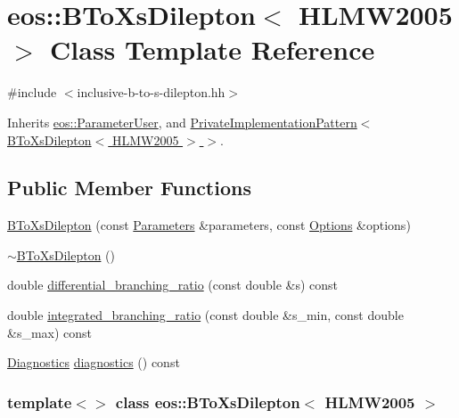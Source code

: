 \hypertarget{classeos_1_1BToXsDilepton_3_01HLMW2005_01_4}{
\section{eos::BToXsDilepton$<$ HLMW2005 $>$ Class Template Reference}
\label{classeos_1_1BToXsDilepton_3_01HLMW2005_01_4}
}


{\ttfamily \#include $<$inclusive-\/b-\/to-\/s-\/dilepton.hh$>$}

Inherits \hyperlink{classeos_1_1ParameterUser}{eos::ParameterUser}, and \hyperlink{classeos_1_1PrivateImplementationPattern}{PrivateImplementationPattern$<$ BToXsDilepton$<$ HLMW2005 $>$ $>$}.\subsection*{Public Member Functions}
\begin{DoxyCompactItemize}
\item 
\hyperlink{classeos_1_1BToXsDilepton_3_01HLMW2005_01_4_a997b4d786efbb0ff51c97a713d9ebc6a}{BToXsDilepton} (const \hyperlink{classeos_1_1Parameters}{Parameters} \&parameters, const \hyperlink{classeos_1_1Options}{Options} \&options)
\item 
\hyperlink{classeos_1_1BToXsDilepton_3_01HLMW2005_01_4_aca8fb79f169510f38c606b37f9ee6567}{$\sim$BToXsDilepton} ()
\item 
double \hyperlink{classeos_1_1BToXsDilepton_3_01HLMW2005_01_4_ad223046598df015f9571f639095d3ec8}{differential\_\-branching\_\-ratio} (const double \&s) const 
\item 
double \hyperlink{classeos_1_1BToXsDilepton_3_01HLMW2005_01_4_a3871ea69216b034c2e9ba4ef4d81bf35}{integrated\_\-branching\_\-ratio} (const double \&s\_\-min, const double \&s\_\-max) const 
\item 
\hyperlink{classeos_1_1Diagnostics}{Diagnostics} \hyperlink{classeos_1_1BToXsDilepton_3_01HLMW2005_01_4_a52557122e3fbd57e44a3fad9ef88ce5b}{diagnostics} () const 
\end{DoxyCompactItemize}
\subsubsection*{template$<$$>$ class eos::BToXsDilepton$<$ HLMW2005 $>$}



